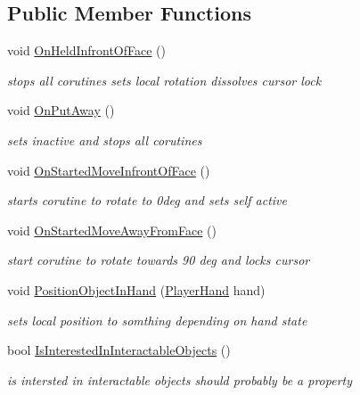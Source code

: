 \subsection*{Public Member Functions}
\begin{DoxyCompactItemize}
\item 
void \mbox{\hyperlink{class_meta_data_display_ab91c62e23ca6af27f8a30859d5a172c9}{On\+Held\+Infront\+Of\+Face}} ()
\begin{DoxyCompactList}\small\item\em stops all corutines sets local rotation dissolves cursor lock \end{DoxyCompactList}\item 
void \mbox{\hyperlink{class_meta_data_display_a55888c6c3e3e224d89d95b6c63652762}{On\+Put\+Away}} ()
\begin{DoxyCompactList}\small\item\em sets inactive and stops all corutines \end{DoxyCompactList}\item 
void \mbox{\hyperlink{class_meta_data_display_aa0a9b9ca8243943104c82602e69a0541}{On\+Started\+Move\+Infront\+Of\+Face}} ()
\begin{DoxyCompactList}\small\item\em starts corutine to rotate to 0deg and sets self active \end{DoxyCompactList}\item 
void \mbox{\hyperlink{class_meta_data_display_a98518b3d82ffd1e428cab9a2328fb018}{On\+Started\+Move\+Away\+From\+Face}} ()
\begin{DoxyCompactList}\small\item\em start corutine to rotate towards 90 deg and locks cursor \end{DoxyCompactList}\item 
void \mbox{\hyperlink{class_meta_data_display_a1ecbc336a25464fc9999120066263e2a}{Position\+Object\+In\+Hand}} (\mbox{\hyperlink{class_player_hand}{Player\+Hand}} hand)
\begin{DoxyCompactList}\small\item\em sets local position to somthing depending on hand state \end{DoxyCompactList}\item 
bool \mbox{\hyperlink{class_meta_data_display_a6aa943864ef85667977a13c895c2ce23}{Is\+Interested\+In\+Interactable\+Objects}} ()
\begin{DoxyCompactList}\small\item\em is intersted in interactable objects should probably be a property \end{DoxyCompactList}\item 

\end{DoxyCompactItemize}

